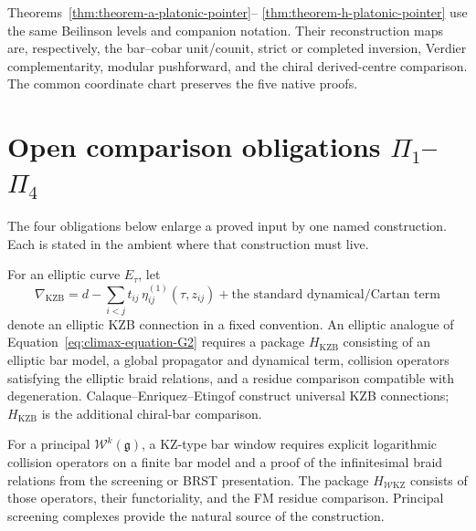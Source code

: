 \begin{remark}
\label{rem:five-corollaries-together-platonic}
Theorems~\ref{thm:theorem-a-platonic-pointer}--%
\ref{thm:theorem-h-platonic-pointer} use the same Beilinson levels and
companion notation.  Their reconstruction maps are, respectively, the
bar--cobar unit/counit, strict or completed inversion, Verdier
complementarity, modular pushforward, and the chiral derived-centre
comparison.  The common coordinate chart preserves the five native
proofs.
\end{remark}


\section{Open comparison obligations \(\Pi_1\)--\(\Pi_4\)}
\label{sec:climax-platonic-open-obstructions}

The four obligations below enlarge a proved input by one named
construction.  Each is stated in the ambient where that construction
must live.

\begin{conjecture}
\label{conj:climax-kzb-genus-one-platonic}
\ClaimStatusConjectured
For an elliptic curve \(E_\tau\), let
\begin{equation}
\label{eq:nabla-kzb-platonic}
 \nabla_{\mathrm{KZB}}
 =
 d-\sum_{i<j}t_{ij}\,\eta^{(1)}_{ij}(\tau,z_{ij})
 +\text{the standard dynamical/Cartan term}
\end{equation}
denote an elliptic KZB connection in a fixed convention.  An elliptic
analogue of Equation~\eqref{eq:climax-equation-G2} requires a package
\(H_{\mathrm{KZB}}\) consisting of an elliptic bar model, a global
propagator and dynamical term, collision operators satisfying the
elliptic braid relations, and a residue comparison compatible with
degeneration.  Calaque--Enriquez--Etingof construct universal KZB
connections; \(H_{\mathrm{KZB}}\) is the additional chiral-bar
comparison.
\end{conjecture}

\begin{conjecture}
\label{conj:climax-w-arena-platonic}
\ClaimStatusConjectured
For a principal \(\mathcal W^k(\mathfrak g)\), a KZ-type bar window
requires explicit logarithmic collision operators on a finite bar
model and a proof of the infinitesimal braid relations from the
screening or BRST presentation.  The package
\(H_{\mathcal W\mathrm{KZ}}\) consists of those operators, their
functoriality, and the FM residue comparison.  Principal screening
complexes provide the natural source of the construction.
\end{conjecture}

